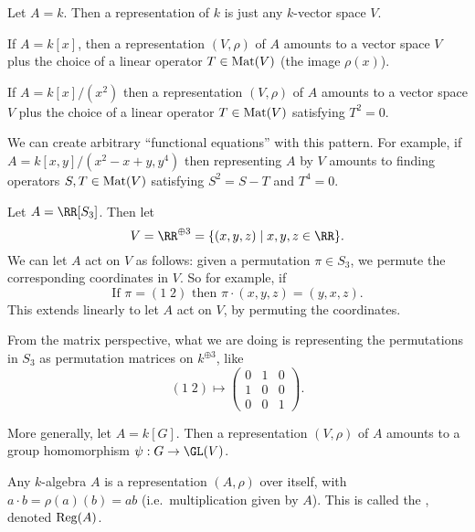 \documentclass[11pt]{scrreprt}
\begin{document}
\begin{example}
	\listhack
	\begin{enumerate}[(a)]
		\ii Let $A = k$.
		Then a representation of $k$ is just any $k$-vector space $V$.

		\ii If $A = k[x]$,
		then a representation $(V, \rho)$ of $A$
		amounts to a vector space $V$ plus the choice of
		a linear operator $T \in \mathrm{Mat}(V)$ (the image $\rho(x)$).

		\ii If $A = k[x] / (x^2)$
		then a representation $(V, \rho)$ of $A$
		amounts to a vector space $V$ plus the choice of
		a linear operator $T \in \mathrm{Mat}(V)$ satisfying $T^2 = 0$.

		\ii We can create arbitrary ``functional equations'' with this pattern.
		For example, if $A = k[x,y] / (x^2 - x+y, y^4)$
		then representing $A$ by $V$ amounts to finding operators
		$S, T \in \mathrm{Mat}(V)$ satisfying $S^2 = S-T$ and $T^4 = 0$.
	\end{enumerate}
\end{example}


\begin{example}
	\listhack
	\begin{enumerate}[(a)]
		\ii Let $A = \RR[S_3]$.
		Then let 
		\[ V = \RR^{\oplus 3} = \{ (x,y,z) \mid x,y,z \in \RR \}. \]
		We can let $A$ act on $V$ as follows:
		given a permutation $\pi \in S_3$, we permute the corresponding
		coordinates in $V$.
		So for example, if 
		\[ \text{If } \pi = (1 \; 2)
		\text{ then } \pi \cdot (x,y,z) = (y,x,z). \]
		This extends linearly to let $A$ act on $V$,
		by permuting the coordinates.

		From the matrix perspective, what we are doing
		is representing the permutations in $S_3$
		as permutation matrices on $k^{\oplus 3}$, like
		\[ (1 \; 2)
		\mapsto \begin{pmatrix} 0&1&0 \\ 1&0&0 \\ 0&0&1 \end{pmatrix}. \]
		
		\ii More generally, let $A = k[G]$.
		Then a representation $(V, \rho)$ of $A$ amounts to 
		a group homomorphism $\psi : G \to \GL(V)$.
	\end{enumerate}
\end{example}
\begin{example}
	Any $k$-algebra $A$ is a representation $(A, \rho)$ over itself,
	with $a \cdot b = \rho(a)(b) = ab$ (i.e.\ multiplication given by $A$).
	This is called the , denoted $\operatorname{Reg}(A)$.
\end{example}
\end{document}
